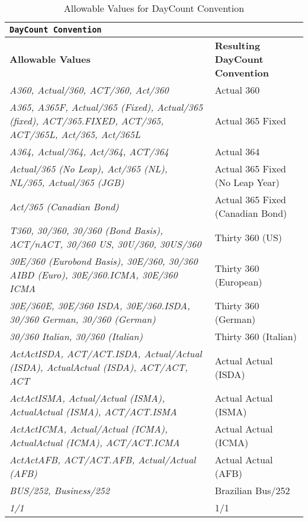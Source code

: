 \begin{table}[H]
\centering
  \begin{tabular} {|p{6cm}|p{6cm}|}
    \hline
    \multicolumn{2}{|l|}{\tt DayCount Convention}                          \\ \hline
    \bfseries{Allowable Values} & \bfseries{Resulting DayCount Convention} \\
    \hline
    \emph{A360, Actual/360, ACT/360, Act/360}& Actual 360  \\ \hline
    \emph{A365, A365F, Actual/365 (Fixed), Actual/365 (fixed), ACT/365.FIXED, ACT/365, ACT/365L, Act/365, Act/365L} & Actual 365 Fixed \\ \hline
    \emph{A364, Actual/364, Act/364, ACT/364}& Actual 364  \\ \hline
    \emph{Actual/365 (No Leap), Act/365 (NL), NL/365, Actual/365 (JGB)} & Actual 365 Fixed (No Leap Year)\\ \hline
    \emph{Act/365 (Canadian Bond)} & Actual 365 Fixed (Canadian Bond)\\ \hline
    \emph{T360, 30/360, 30/360 (Bond Basis), ACT/nACT, 30/360 US, 30U/360, 30US/360} & Thirty 360 (US) \\ \hline
    \emph{30E/360 (Eurobond Basis), 30E/360, 30/360 AIBD (Euro), 30E/360.ICMA, 30E/360 ICMA} & Thirty 360 (European) \\ \hline
    \emph{30E/360E, 30E/360 ISDA, 30E/360.ISDA, 30/360 German, 30/360 (German)} & Thirty 360 (German) \\ \hline
    \emph{30/360 Italian, 30/360 (Italian)} & Thirty 360 (Italian) \\ \hline
    \emph{ActActISDA, ACT/ACT.ISDA, Actual/Actual (ISDA), ActualActual (ISDA), ACT/ACT, ACT} & Actual Actual (ISDA) \\ \hline
    \emph{ActActISMA, Actual/Actual (ISMA), ActualActual (ISMA), ACT/ACT.ISMA} & Actual Actual (ISMA) \\ \hline
    \emph{ActActICMA, Actual/Actual (ICMA), ActualActual (ICMA), ACT/ACT.ICMA} & Actual Actual (ICMA) \\ \hline
    \emph{ActActAFB, ACT/ACT.AFB, Actual/Actual (AFB)} & Actual Actual (AFB) \\ \hline
    \emph{BUS/252, Business/252} & Brazilian Bus/252 \\ \hline
    \emph{1/1} & 1/1  \\ \hline
  \end{tabular}
  \caption{Allowable Values for DayCount Convention}
  \label{tab:daycount}
\end{table}

